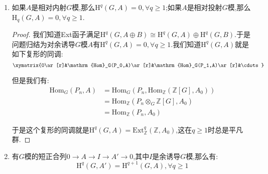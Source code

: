 \begin{enumerate}
\begin{proof}
		设$A$是内射$G$模,那么$A$可以嵌入到余诱导$G$模$\mathrm{coInd}^G(I)=\mathrm{Hom}_{\mathbb{Z}}(\mathbb{Z}[G],I)$中,这里阿贝尔群$I$可以嵌入到某个可除交换群$J$中(阿贝尔群范畴上的内射对象就是可除交换群),导致$\mathrm{coInd}^G(I)$可以嵌入到$\mathrm{coInd}^G(J)$,于是我们不妨直接设$I$是可除交换群.由于$A$是内射的,于是它作为$G$模是$\mathrm{coInd}^G(I)$的直和项,所以一旦我们证明$\mathrm{Hom}_{\mathbb{Z}}(\mathbb{Z}[G],I)$作为$H$模是内射的,就得到它的直和项$A$也是内射$H$模.但是这里$\mathbb{Z}[G]$是若干$\mathbb{Z}[H]$的直和,按照$\mathrm{Hom}$第一个分量的直和提出来可以变成直积,于是$\mathrm{Hom}_{\mathbb{Z}}(\mathbb{Z}[G],I)$是若干$\mathrm{Hom}_{\mathbb{Z}}(\mathbb{Z}[H],I)$的直积,但是这里$\mathrm{Hom}_{\mathbb{Z}}(\mathbb{Z}[H],I)$是内射$H$模,内射模的直积是内射模,这就得到$\mathrm{Hom}_{\mathbb{Z}}(\mathbb{Z}[G],I)$是内射$H$模.
	\end{proof}
	\item 如果$A$是相对内射$G$模,那么$\mathrm{H}^q(G,A)=0,\forall q\ge1$;如果$A$是相对投射$G$模,那么$\mathrm{H}_q(G,A)=0,\forall q\ge1$.
	\begin{proof}
		
		我们知道Ext函子满足$\mathrm{H}^q(G,A\oplus B)\cong\mathrm{H}^q(G,A)\oplus\mathrm{H}^q(G,B)$.于是问题归结为对余诱导$G$模$A$有$\mathrm{H}^q(G,A)=0,\forall q\ge1$.我们知道$\mathrm{H}^q(G,A)$就是如下复形的同调:
		$$\xymatrix{0\ar[r]&\mathrm{Hom}_G(P_0,A)\ar[r]&\mathrm{Hom}_G(P_1,A)\ar[r]&\cdots}$$
		
		但是我们有:
		\begin{align*}
			\mathrm{Hom}_G(P_n,A)&=\mathrm{Hom}_G(P_n,\mathrm{Hom}_{\mathbb{Z}}(\mathbb{Z}[G],A_0))\\&=\mathrm{Hom}_{\mathbb{Z}}(P_n\otimes_G\mathbb{Z}[G],A_0)\\&=\mathrm{Hom}_{\mathbb{Z}}(P_n,A_0)
		\end{align*}
		
		于是这个复形的同调就是$\mathrm{H}^q(G,A)=\mathrm{Ext}_{\mathbb{Z}}^q(\mathbb{Z},A_0)$,这在$q\ge1$时总是平凡群.
	\end{proof}
	\item 有$G$模的短正合列$0\to A\to I\to A'\to0$,其中$I$是余诱导$G$模,那么有:
	$$\mathrm{H}^q(G,A')=\mathrm{H}^{q+1}(G,A),\forall q\ge1$$
\end{enumerate}

